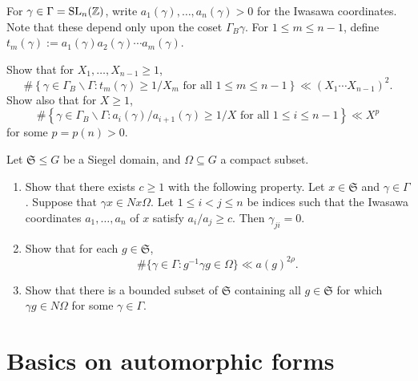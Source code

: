 \documentclass[reqno]{amsart} 
\begin{document}
\begin{exercise}
  For $\gamma \in \Gamma = \operatorname{SL}_n(\mathbb{Z})$, write $a_1(\gamma), \dotsc, a_n(\gamma) > 0$ for the Iwasawa coordinates.  Note that these depend only upon the coset $\Gamma_B \gamma$.  For $1 \leq m \leq n-1$, define $t_m(\gamma) := a_1(\gamma) a_2(\gamma) \dotsb a_m(\gamma)$.

  Show that for $X_1, \dotsc, X_{n-1} \geq 1$,
  \begin{equation*}
    \# \left\{ \gamma \in \Gamma_B \backslash \Gamma : t_m(\gamma) \geq 1/X_m \text{ for all } 1 \leq m \leq n-1 \right\} \ll (X_1 \dotsb X_{n-1})^2.
  \end{equation*}
  Show also that for $X \geq 1$,
  \begin{equation*}
    \# \left\{ \gamma \in \Gamma_B \backslash \Gamma : a_i(\gamma) / a_{i+1}(\gamma) \geq 1/X \text{ for all } 1 \leq i \leq n-1 \right\} \ll X^p
  \end{equation*}
  for some $p = p(n) > 0$.
\end{exercise}

\begin{exercise}
  Let $\mathfrak{S} \leq G$ be a Siegel domain, and $\Omega \subseteq G$ a compact subset.
  \begin{enumerate}
  \item Show that there exists $c \geq 1$ with the following property.  Let $x \in \mathfrak{S}$ and $\gamma \in \Gamma$.  Suppose that $\gamma x \in N x \Omega$.  Let $1 \leq i < j \leq n$ be indices such that the Iwasawa coordinates $a_1,\dotsc,a_n$ of $x$ satisfy $a_i / a_j \geq c$.  Then $\gamma_{j i} = 0$.
  \item Show that for each $g \in \mathfrak{S}$,
    \begin{equation*}
      \# \{ \gamma \in \Gamma : g^{-1} \gamma g \in \Omega \} \ll a(g)^{2 \rho}.
    \end{equation*}
  \item Show that there is a bounded subset of $\mathfrak{S}$ containing all $g \in \mathfrak{S}$
    for which $\gamma g \in N \Omega$ for some  $\gamma \in \Gamma$.
  \end{enumerate}
\end{exercise}


\section{Basics on automorphic forms}
\end{document}
